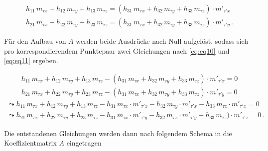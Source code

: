 
\begin{gather}
	h_{11}\,m_{\tau x}+h_{12}\,m_{\tau y}+h_{13}\,m_{\tau z}= (h_{31}\,m_{\tau x}+h_{32}\,m_{\tau y}+h_{33}\,m_{\tau z}) \cdot m'_{\tau' x}\\
	h_{21}\,m_{\tau x}+h_{22}\,m_{\tau y}+h_{23}\,m_{\tau z}= (h_{31}\,m_{\tau x}+h_{32}\,m_{\tau y}+h_{33}\,m_{\tau z}) \cdot m'_{\tau' y} \, .
\end{gather}

Für den Aufbau von $A$ werden beide Ausdrücke nach Null aufgelöst, sodass sich pro korrespondierendem Punktepaar zwei Gleichungen nach \ref{eq:eq10} und \ref{eq:eq11} ergeben.

\begin{gather*}
	h_{11}\,m_{\tau x}+h_{12}\,m_{\tau y}+h_{13}\,m_{\tau z} -(h_{31}\,m_{\tau x}+h_{32}\,m_{\tau y}+h_{33}\,m_{\tau z}) \cdot m'_{\tau' x}= 0 \\	h_{21}\,m_{\tau x}+h_{22}\,m_{\tau y}+h_{23}\,m_{\tau z}-(h_{31}\,m_{\tau x}+h_{32}\,m_{\tau y}+h_{33}\,m_{\tau z}) \cdot m'_{\tau' y}=0
\end{gather*}
\begin{gather}
	\leadsto h_{11}\,m_{\tau x}+h_{12}\,m_{\tau y}+h_{13}\,m_{\tau z} -h_{31}\,m_{\tau x}\cdot m'_{\tau' x} - h_{32}\,m_{\tau y} \cdot m'_{\tau' x}-h_{33}\,m_{\tau z}\cdot m'_{\tau' x}= 0 \label{eq:eq10}\\
	\leadsto h_{21}\,m_{\tau x}+h_{22}\,m_{\tau y}+h_{23}\,m_{\tau z}-h_{31}\,m_{\tau x}\cdot m'_{\tau' y} -h_{32}\,m_{\tau x} \cdot m'_{\tau' y} -h_{33}\,m_{\tau z}) \cdot m'_{\tau' z}=0 \, .\label{eq:eq11}
\end{gather}

Die entstandenen Gleichungen werden dann nach folgendem Schema in die Koeffizientmatrix $A$ eingetragen\cite{Elements,HZ,Schwarz,Heipke}

